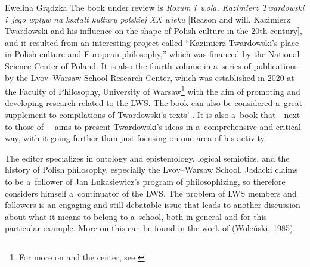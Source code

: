 \begin{newrevengenv}{Ewelina Grądzka}
The book under review is \textit{Rozum i~wola. Kazimierz Twardowski i~jego wpływ na kształt kultury polskiej XX wieku} [Reason and will. Kazimierz Twardowski and his influence on the shape of Polish culture in the 20th century], and it resulted from an interesting project called ``Kazimierz Twardowski's place in Polish culture and European philosophy,'' which was financed by the National Science Center of Poland. It is also the fourth volume in a~series of publications
\parencites[cf.][]{brozek_analiza_2020}{brozek_anti-irrationalism_2020}{jadacki_stanislaw_2020}
by the Lvov–Warsaw School Research Center, which was established in 2020 at the Faculty of Philosophy, University of Warsaw\footnote{For more on \parencite{brozek_analiza_2020} and the center, see \parencites{gradzka_putting_2021}{gradzka_report_2021}}
with the aim of promoting and developing research related to the LWS. The book can also be considered a~great supplement to compilations of Twardowski's texts'
\parencites{twardowski_rozprawy_1927}{decewicz_wybor_1992}{twardowski_mysl_2013}{twardowski_mysl_2014}{brandl_actions_1999}{brozek_anti-irrationalism_2020}.
It is also a~book that---next to those of
\parencites{jadczak_czlowiek_1993}{kleszcz_metoda_2013}[and][]{brozek_kazimierz_2015}---aims to present Twardowski's ideas in a~comprehensive and critical way, with it going further than just focusing on one area of his activity.


The editor specializes in ontology and epistemology, logical semiotics, and the history of Polish philosophy, especially the Lvov–Warsaw School. Jadacki claims to be a~follower of Jan Łukasiewicz's program of philosophizing, so therefore considers himself a~continuator of the LWS. The problem of LWS members and followers is an engaging and still debatable issue that leads to another discussion about what it means to belong to a~school, both in general and for this particular example. More on this can be found in the work of (Woleński, 1985).


\end{newrevengenv}
